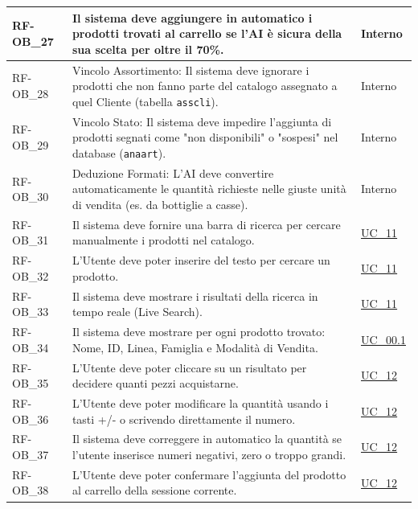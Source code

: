 \begin{longtable}{|>{\raggedright}p{}|>{\raggedright\arraybackslash}p{}|>{\raggedright\arraybackslash}p{}|}
    \hline
    RF-OB\_27 \hypertarget{rf-ob_27} & Il sistema deve aggiungere in automatico i prodotti trovati al carrello se l'AI è sicura della sua scelta per oltre il 70\%. & Interno \\
    \hline
    RF-OB\_28 \hypertarget{rf-ob_28} & Vincolo Assortimento: Il sistema deve ignorare i prodotti che non fanno parte del catalogo assegnato a quel Cliente (tabella \texttt{asscli}). & Interno \\
    \hline
    RF-OB\_29 \hypertarget{rf-ob_29} & Vincolo Stato: Il sistema deve impedire l'aggiunta di prodotti segnati come "non disponibili" o "sospesi" nel database (\texttt{anaart}). & Interno \\
    \hline
    RF-OB\_30 \hypertarget{rf-ob_30} & Deduzione Formati: L'AI deve convertire automaticamente le quantità richieste nelle giuste unità di vendita (es. da bottiglie a casse). & Interno \\
    \hline
    RF-OB\_31 \hypertarget{rf-ob_31} & Il sistema deve fornire una barra di ricerca per cercare manualmente i prodotti nel catalogo. & \hyperref[uc_11]{UC\_11} \\
    \hline
    RF-OB\_32 \hypertarget{rf-ob_32} & L'Utente deve poter inserire del testo per cercare un prodotto. & \hyperref[uc_11]{UC\_11} \\
    \hline
    RF-OB\_33 \hypertarget{rf-ob_33} & Il sistema deve mostrare i risultati della ricerca in tempo reale (Live Search). & \hyperref[uc_11]{UC\_11} \\
    \hline
    RF-OB\_34 \hypertarget{rf-ob_34} & Il sistema deve mostrare per ogni prodotto trovato: Nome, ID, Linea, Famiglia e Modalità di Vendita. & \hyperref[uc_00.1]{UC\_00.1} \\
    \hline
    RF-OB\_35 \hypertarget{rf-ob_35} & L'Utente deve poter cliccare su un risultato per decidere quanti pezzi acquistarne. & \hyperref[uc_12]{UC\_12} \\
    \hline
    RF-OB\_36 \hypertarget{rf-ob_36} & L'Utente deve poter modificare la quantità usando i tasti +/- o scrivendo direttamente il numero. & \hyperref[uc_12]{UC\_12} \\
    \hline
    RF-OB\_37 \hypertarget{rf-ob_37} & Il sistema deve correggere in automatico la quantità se l'utente inserisce numeri negativi, zero o troppo grandi. & \hyperref[uc_12]{UC\_12} \\
    \hline
    RF-OB\_38 \hypertarget{rf-ob_38} & L'Utente deve poter confermare l'aggiunta del prodotto al carrello della sessione corrente. & \hyperref[uc_12]{UC\_12} \\

\end{longtable}
